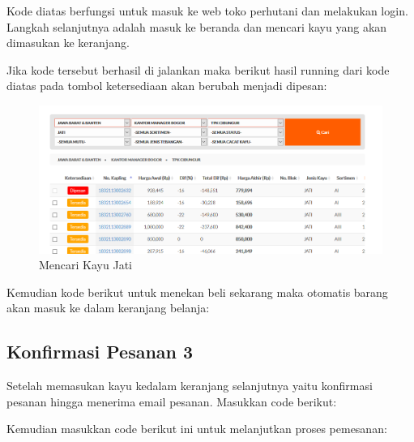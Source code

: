 Kode diatas berfungsi untuk masuk ke web toko perhutani dan melakukan login.
Langkah selanjutnya adalah masuk ke beranda dan mencari kayu yang akan dimasukan ke keranjang.



\newpage
Jika kode tersebut berhasil di jalankan maka berikut hasil running dari kode diatas pada tombol ketersediaan akan berubah menjadi dipesan:
\begin{figure}[h]
	\centering
	\includegraphics[scale=0.3]{figures/6keranjang}
	\caption{Mencari Kayu Jati}
\end{figure}

Kemudian kode berikut untuk menekan beli sekarang maka otomatis barang akan masuk ke dalam keranjang belanja:


\newpage
\subsection{Konfirmasi Pesanan 3}
Setelah memasukan kayu kedalam keranjang selanjutnya yaitu konfirmasi pesanan hingga menerima email pesanan. 
Masukkan code berikut:


Kemudian masukkan code berikut ini untuk melanjutkan proses pemesanan:


